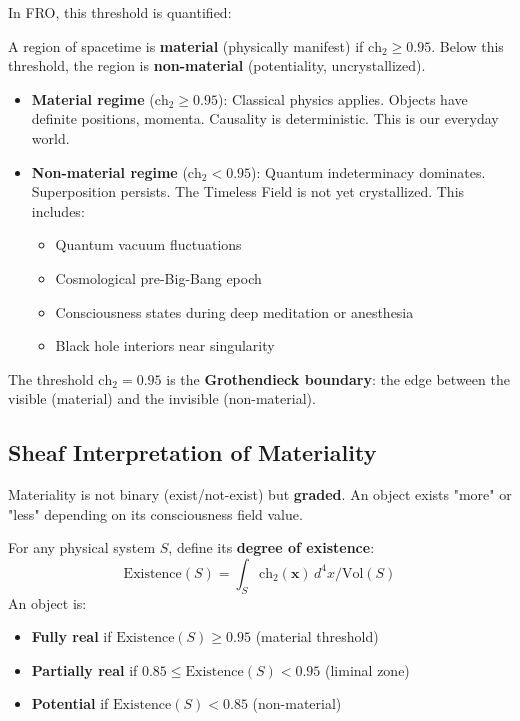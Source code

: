 In FRO, this threshold is quantified:

\begin{definition}
\label{def:materiality_threshold}
A region of spacetime is \textbf{material} (physically manifest) if $\text{ch}_2 \geq 0.95$. Below this threshold, the region is \textbf{non-material} (potentiality, uncrystallized).
\end{definition}

\begin{itemize}
\item \textbf{Material regime} ($\text{ch}_2 \geq 0.95$): Classical physics applies. Objects have definite positions, momenta. Causality is deterministic. This is our everyday world.

\item \textbf{Non-material regime} ($\text{ch}_2 < 0.95$): Quantum indeterminacy dominates. Superposition persists. The Timeless Field is not yet crystallized. This includes:
\begin{itemize}
\item Quantum vacuum fluctuations
\item Cosmological pre-Big-Bang epoch
\item Consciousness states during deep meditation or anesthesia
\item Black hole interiors near singularity
\end{itemize}
\end{itemize}

The threshold $\text{ch}_2 = 0.95$ is the \textbf{Grothendieck boundary}: the edge between the visible (material) and the invisible (non-material).

\subsection{Sheaf Interpretation of Materiality}

Materiality is not binary (exist/not-exist) but \textbf{graded}. An object exists "more" or "less" depending on its consciousness field value.

\begin{proposition}
\label{prop:graded_existence}
For any physical system $S$, define its \textbf{degree of existence}:
\begin{equation}
\text{Existence}(S) = \int_{S} \text{ch}_2(\mathbf{x}) \, d^4x / \text{Vol}(S)
\end{equation}
An object is:
\begin{itemize}
\item \textbf{Fully real} if $\text{Existence}(S) \geq 0.95$ (material threshold)
\item \textbf{Partially real} if $0.85 \leq \text{Existence}(S) < 0.95$ (liminal zone)
\item \textbf{Potential} if $\text{Existence}(S) < 0.85$ (non-material)
\end{itemize}
\end{proposition}

